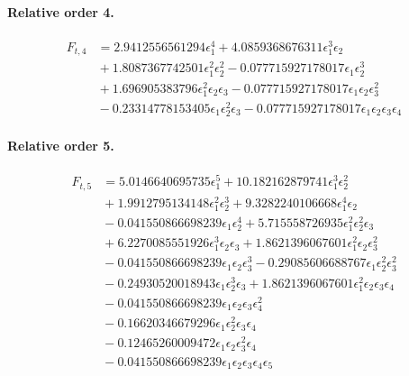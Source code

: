 \documentclass[10pt]{article}
\begin{document}
\paragraph{Relative order 4.}
\begin{align*}
F_{t,4} &= 2.9412556561294 \epsilon_{1}^{4} + 4.0859368676311 \epsilon_{1}^{3} \epsilon_{2} \\
&{}  + 1.8087367742501 \epsilon_{1}^{2} \epsilon_{2}^{2} - 0.077715927178017 \epsilon_{1} \epsilon_{2}^{3} \\
&{}  + 1.696905383796 \epsilon_{1}^{2} \epsilon_{2} \epsilon_{3} - 0.077715927178017 \epsilon_{1} \epsilon_{2} \epsilon_{3}^{2} \\
&{}  - 0.23314778153405 \epsilon_{1} \epsilon_{2}^{2} \epsilon_{3} - 0.077715927178017 \epsilon_{1} \epsilon_{2} \epsilon_{3} \epsilon_{4}
\end{align*}

\paragraph{Relative order 5.}
\begin{align*}
F_{t,5} &= 5.0146640695735 \epsilon_{1}^{5} + 10.182162879741 \epsilon_{1}^{3} \epsilon_{2}^{2} \\
&{}  + 1.9912795134148 \epsilon_{1}^{2} \epsilon_{2}^{3} + 9.3282240106668 \epsilon_{1}^{4} \epsilon_{2} \\
&{}  - 0.041550866698239 \epsilon_{1} \epsilon_{2}^{4} + 5.715558726935 \epsilon_{1}^{2} \epsilon_{2}^{2} \epsilon_{3} \\
&{}  + 6.2270085551926 \epsilon_{1}^{3} \epsilon_{2} \epsilon_{3} + 1.8621396067601 \epsilon_{1}^{2} \epsilon_{2} \epsilon_{3}^{2} \\
&{}  - 0.041550866698239 \epsilon_{1} \epsilon_{2} \epsilon_{3}^{3} - 0.29085606688767 \epsilon_{1} \epsilon_{2}^{2} \epsilon_{3}^{2} \\
&{}  - 0.24930520018943 \epsilon_{1} \epsilon_{2}^{3} \epsilon_{3} + 1.8621396067601 \epsilon_{1}^{2} \epsilon_{2} \epsilon_{3} \epsilon_{4} \\
&{}  - 0.041550866698239 \epsilon_{1} \epsilon_{2} \epsilon_{3} \epsilon_{4}^{2} \\
&{}  - 0.16620346679296 \epsilon_{1} \epsilon_{2}^{2} \epsilon_{3} \epsilon_{4} \\
&{}  - 0.12465260009472 \epsilon_{1} \epsilon_{2} \epsilon_{3}^{2} \epsilon_{4} \\
&{}  - 0.041550866698239 \epsilon_{1} \epsilon_{2} \epsilon_{3} \epsilon_{4} \epsilon_{5}
\end{align*}
\end{document}
